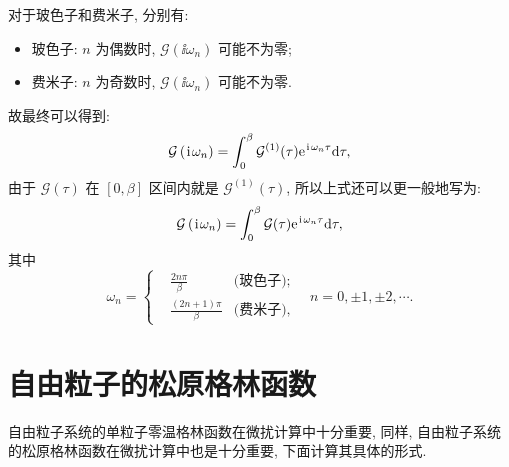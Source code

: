 对于玻色子和费米子, 分别有:
\begin{itemize}
\item 玻色子: $n$ 为偶数时, $\mathcal{G}\left(\ii \omega_n\right)$ 可能不为零;
\item 费米子: $n$ 为奇数时, $\mathcal{G}\left(\ii \omega_n\right)$ 可能不为零.
\end{itemize}
故最终可以得到:
\begin{equation}
\mathcal{G}\left(\hspace{0.1em}\mathrm{i}\hspace{0.1em} \omega_n\right)=\int_0^\beta   \mathcal{G}^{(1)}(\tau) \mathrm{e}^{\hspace{0.1em}\mathrm{i}\hspace{0.1em} \omega_n \tau}\mathrm{d}\tau,
\end{equation}
由于 $\mathcal{G}(\tau)$ 在 $[0, \beta]$ 区间内就是 $\mathcal{G}^{(1)}(\tau)$, 所以上式还可以更一般地写为:
\begin{equation}
\mathcal{G}\left(\hspace{0.1em}\mathrm{i}\hspace{0.1em} \omega_n\right)=\int_0^\beta   \mathcal{G}(\tau) \mathrm{e}^{\hspace{0.1em}\mathrm{i}\hspace{0.1em} \omega_n \tau}\mathrm{d}\tau,
\end{equation}
其中
\begin{equation}
\omega_n=\left\{\begin{aligned}
&\frac{2 n \pi}{\beta} &\text{(玻色子);} \\
&\frac{(2 n+1) \pi}{\beta}& \text {(费米子),}
\end{aligned}\quad n=0, \pm 1, \pm 2, \cdots .\right.
\end{equation}

\section{自由粒子的松原格林函数}
自由粒子系统的单粒子零温格林函数在微扰计算中十分重要, 同样, 自由粒子系统的松原格林函数在微扰计算中也是十分重要, 下面计算其具体的形式.

